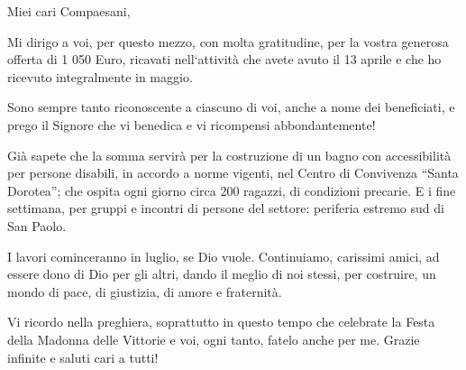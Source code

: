 \begin{citazione}
Miei cari Compaesani,

Mi dirigo a voi, per questo mezzo,  con molta gratitudine, per la vostra generosa offerta di 1 050 Euro, ricavati nell`attività che avete avuto il 13 aprile e che ho ricevuto integralmente in maggio.

Sono sempre tanto riconoscente a ciascuno di voi, anche a nome dei beneficiati, e prego il Signore che vi benedica e vi ricompensi abbondantemente!

Già sapete che la somma servirà per la costruzione di un bagno con accessibilità per persone disabili, in accordo a norme vigenti, nel Centro di Convivenza ``Santa Dorotea''; che ospita ogni giorno circa 200 ragazzi, di condizioni precarie. E i fine settimana, per gruppi e incontri di persone del settore: periferia estremo sud di San Paolo.

I lavori cominceranno in luglio, se Dio vuole. Continuiamo, carissimi amici, ad essere dono di Dio per gli altri, dando il meglio di noi stessi, per costruire, un mondo di pace, di giustizia, di amore e fraternità.

Vi ricordo nella preghiera, soprattutto in questo tempo che celebrate la Festa della Madonna delle Vittorie e voi, ogni tanto, fatelo anche per me.
Grazie infinite e saluti cari a tutti!
\end{citazione}


